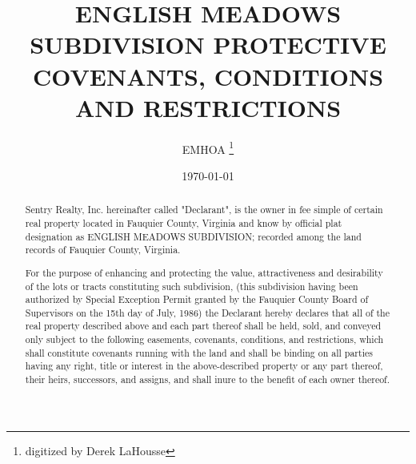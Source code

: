\documentclass[12pt, letterpaper]{article}
\title{ENGLISH MEADOWS SUBDIVISION PROTECTIVE COVENANTS, CONDITIONS AND RESTRICTIONS}
\author{EMHOA \thanks{digitized by Derek LaHousse}}
\date{\today}
\begin{document}

\begin{abstract}
Sentry Realty, Inc. hereinafter called "Declarant", is the owner in fee simple of certain real property located in Fauquier County, Virginia and know by official plat designation as ENGLISH MEADOWS SUBDIVISION; recorded among the land records of Fauquier County, Virginia.

For the purpose of enhancing and protecting the value, attractiveness and desirability of the lots or tracts constituting such subdivision, (this subdivision having been authorized by Special Exception Permit granted by the Fauquier County Board of Supervisors on the 15th day of July, 1986) the Declarant hereby declares that all of the real property described above and each part thereof shall be held, sold, and conveyed only subject to the following easements, covenants, conditions, and restrictions, which shall constitute covenants running with the land and shall be binding on all parties having any right, title or interest in the above-described property or any part thereof, their heirs, successors, and assigns, and shall inure to the benefit of each owner thereof.
\end{abstract}
\end{document}
